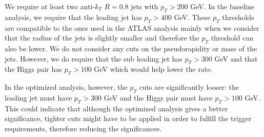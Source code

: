 We require at least two anti-$k_T$ $R=0.8$ jets with $p_T>200$ GeV. In the baseline analysis, we require that the leading jet has $p_T>400$ GeV. These $p_T$ thresholds are compatible to the ones used in the ATLAS analysis mainly when we consider that the radius of the jets is slightly smaller and therefore the $p_T$ threshold can also be lower. We do not consider any cuts on the pseudorapidity or mass of the jets. However, we do require that the sub leading jet has $p_T>300$ GeV and that the Higgs pair has $p_T>100$ GeV which would help lower the rate. 

In the optimized analysis, however, the $p_T$ cuts are significantly looser: the leading jet must have $p_T>300$ GeV and the Higgs pair must have $p_T>100$ GeV. This could indicate that although the optimized analysis gives a better significance, tighter cuts might have to be applied in order to fulfill the trigger requirements, therefore reducing the significancee.

